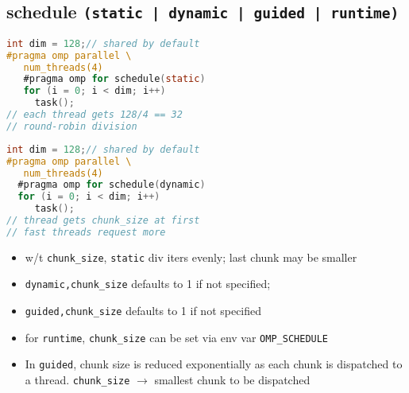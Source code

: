 \documentclass[8pt,a4paper,landscape]{extarticle}
\begin{document}
\pagestyle{empty}

\begin{multicols*}{3}
% 
% 
% 
% 

% 

% 
% 
% 
% 

% 

\subsection*{schedule \texttt{(static | dynamic | guided | runtime)}}
\begin{minipage}{0.5\linewidth}
\begin{lstlisting}[language=C,xrightmargin=3pt]
int dim = 128;// shared by default
#pragma omp parallel \
   num_threads(4)
   #pragma omp for schedule(static)
   for (i = 0; i < dim; i++)
     task();
// each thread gets 128/4 == 32
// round-robin division
\end{lstlisting}
\end{minipage}
\begin{minipage}{0.5\linewidth}
\begin{lstlisting}[language=C,xleftmargin=3pt]
int dim = 128;// shared by default
#pragma omp parallel \
   num_threads(4)
  #pragma omp for schedule(dynamic)
  for (i = 0; i < dim; i++)
     task();
// thread gets chunk_size at first
// fast threads request more
\end{lstlisting}
\end{minipage}
\begin{itemize}
\item w/t \texttt{chunk\_size}, \texttt{static} div iters evenly; last chunk may be smaller
\item \texttt{dynamic,chunk\_size} defaults to 1 if not specified;
\item \texttt{guided,chunk\_size} defaults to 1 if not specified
\item for \texttt{runtime}, \texttt{chunk\_size} can be set via env var \texttt{OMP\_SCHEDULE}
\item In \texttt{guided}, chunk size is reduced exponentially as each chunk is dispatched to a thread. \texttt{chunk\_size} $\rightarrow$ smallest chunk to be dispatched
\end{itemize}

\end{multicols*}
\end{document}

